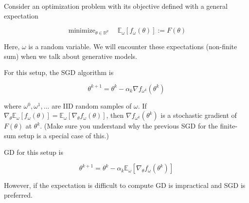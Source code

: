 \begin{concept}
    Consider an optimization problem with its objective defined with a general expectation

    $$
    \operatorname{minimize}_{\theta \in \mathbb{R}^{p}} \quad \mathbb{E}_{\omega}\left[f_{\omega}(\theta)\right]:=F(\theta)
    $$

    Here, $\omega$ is a random variable. We will encounter these expectations (non-finite sum) when we talk about generative models.

    For this setup, the SGD algorithm is

    $$
    \theta^{k+1}=\theta^{k}-\alpha_{k} \nabla f_{\omega^{k}}\left(\theta^{k}\right)
    $$

    where $\omega^{0}, \omega^{1}, \ldots$ are IID random samples of $\omega$. If $\nabla_{\theta} \mathbb{E}_{\omega}\left[f_{\omega}(\theta)\right]=\mathbb{E}_{\omega}\left[\nabla_{\theta} f_{\omega}(\theta)\right]$, then $\nabla f_{\omega^{k}}\left(\theta^{k}\right)$ is a stochastic gradient of $F(\theta)$ at $\theta^{k}$. (Make sure you understand why the previous SGD for the finite-sum setup is a special case of this.)

    GD for this setup is

    $$
    \theta^{k+1}=\theta^{k}-\alpha_{k} \mathbb{E}_{\omega}\left[\nabla_{\theta} f_{\omega}\left(\theta^{k}\right)\right]
    $$

    However, if the expectation is difficult to compute GD is impractical and SGD is preferred.
\end{concept}
